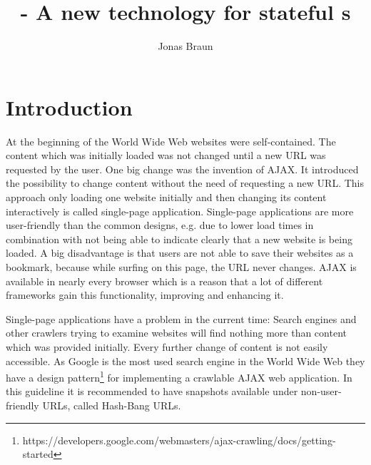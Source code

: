 \documentclass[f,bachelor,binding,twoside,palatino]{WeSTthesis}
\author{Jonas Braun}
\title{\pjaxr{} - A new technology for stateful \singlePageApplication{}s}
\def \ajax {AJAX}
\def \singlePageApplication {single-page application}
\def \SinglePageApplication {Single-page application}
\begin{document}

\maketitle %

\tableofcontents

\varclearpage



\newcommand\todo[1]{\textcolor{red}{#1}}

\section{Introduction}
  At the beginning of the World Wide Web websites were self-contained. The content which was initially loaded was not changed until a new URL was requested by the user.
  One big change was the invention of \ajax{}. It introduced the possibility to change content without the need of requesting a new URL.
  This approach only loading one website initially and then changing its content interactively is called \singlePageApplication{}.
  \SinglePageApplication{}s are more user-friendly than the common designs, e.g. due to lower load times in combination with not being able to indicate clearly that a new website is being loaded.
  A big disadvantage is that users are not able to save their websites as a bookmark, because while surfing on this page, the URL never changes.
  \ajax{} is available in nearly every browser which is a reason that a lot of different frameworks gain this functionality, improving and enhancing it.

  \SinglePageApplication{}s have a problem in the current time: Search engines and other crawlers trying to examine websites will find nothing more than content which was provided initially. Every further change of content is not easily accessible.
  As Google is the most used search engine in the World Wide Web they have a design pattern\footnote{https://developers.google.com/webmasters/ajax-crawling/docs/getting-started} for implementing a crawlable \ajax{} web application. 
  In this guideline it is recommended to have snapshots available under non-user-friendly URLs, called Hash-Bang URLs.
\end{document}
